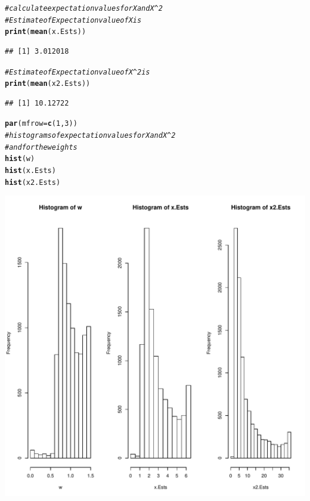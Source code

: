 \documentclass{article}\usepackage[]{graphicx}\usepackage[]{color}
\makeatletter
\def\maxwidth{ %
  \ifdim\Gin@nat@width>\linewidth
    \linewidth
  \else
    \Gin@nat@width
  \fi
}
\newcommand{\hlnum}[1]{\textcolor[rgb]{0.686,0.059,0.569}{#1}}%
\newcommand{\hlcom}[1]{\textcolor[rgb]{0.678,0.584,0.686}{\textit{#1}}}%
\newcommand{\hlstd}[1]{\textcolor[rgb]{0.345,0.345,0.345}{#1}}%
\newcommand{\hlkwc}[1]{\textcolor[rgb]{0.333,0.667,0.333}{#1}}%
\newcommand{\hlkwd}[1]{\textcolor[rgb]{0.737,0.353,0.396}{\textbf{#1}}}%
\newenvironment{kframe}{%
 \def\at@end@of@kframe{}%
 \ifinner\ifhmode%
  \def\at@end@of@kframe{\end{minipage}}%
  \begin{minipage}{\columnwidth}%
 \fi\fi%
 \def\FrameCommand##1{\hskip\@totalleftmargin \hskip-\fboxsep
 \colorbox{shadecolor}{##1}\hskip-\fboxsep
     \hskip-\linewidth \hskip-\@totalleftmargin \hskip\columnwidth}%
 \MakeFramed {\advance\hsize-\width
   \@totalleftmargin\z@ \linewidth\hsize
   \@setminipage}}%
 {\par\unskip\endMakeFramed%
 \at@end@of@kframe}
\newenvironment{knitrout}{}{} %
\makeatother
\begin{document}
\begin{knitrout}
\begin{kframe}
\begin{alltt}
\hlcom{#calculate expectation values for X and X^2}
\hlcom{#Estimate of Expectation value of X is}
\hlkwd{print}\hlstd{(}\hlkwd{mean}\hlstd{(x.Ests))}
\end{alltt}
\begin{verbatim}
## [1] 3.012018
\end{verbatim}
\begin{alltt}
\hlcom{#Estimate of Expectation value of X^2 is}
\hlkwd{print}\hlstd{(}\hlkwd{mean}\hlstd{(x2.Ests))}
\end{alltt}
\begin{verbatim}
## [1] 10.12722
\end{verbatim}
\begin{alltt}
\hlkwd{par}\hlstd{(}\hlkwc{mfrow}\hlstd{=}\hlkwd{c}\hlstd{(}\hlnum{1}\hlstd{,}\hlnum{3}\hlstd{))}
\hlcom{#histograms of expectation values for X and X^2}
\hlcom{#and for the weights}
\hlkwd{hist}\hlstd{(w)}
\hlkwd{hist}\hlstd{(x.Ests)}
\hlkwd{hist}\hlstd{(x2.Ests)}
\end{alltt}
\end{kframe}
\includegraphics[width=\maxwidth]{figure/unnamed-chunk-2-1} 

\end{knitrout}
\end{document}

